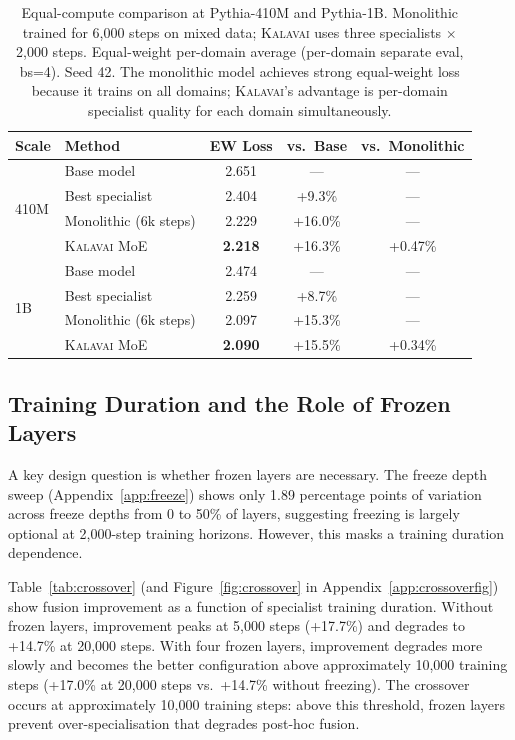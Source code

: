\documentclass{article}
\newcommand{\kalavai}{\textsc{Kalavai}\xspace}
\begin{document}
\begin{table}[h]
\centering
\caption{Equal-compute comparison at Pythia-410M and Pythia-1B. Monolithic trained for 6,000 steps on mixed data; \kalavai uses three specialists $\times$ 2,000 steps. Equal-weight per-domain average (per-domain separate eval, bs=4). Seed 42. The monolithic model achieves strong equal-weight loss because it trains on all domains; \kalavai's advantage is per-domain specialist quality for each domain simultaneously.}
\label{tab:monolithic}
\begin{tabular}{llccc}
\toprule
\textbf{Scale} & \textbf{Method} & \textbf{EW Loss} & \textbf{vs.\ Base} & \textbf{vs.\ Monolithic} \\
\midrule
\multirow{4}{*}{410M}
 & Base model            & 2.651 & ---      & ---       \\
 & Best specialist       & 2.404 & +9.3\%  & ---       \\
 & Monolithic (6k steps) & 2.229 & +16.0\% & ---       \\
 & \kalavai MoE          & \textbf{2.218} & +16.3\% & +0.47\% \\
\midrule
\multirow{4}{*}{1B}
 & Base model            & 2.474 & ---      & ---       \\
 & Best specialist       & 2.259 & +8.7\%  & ---       \\
 & Monolithic (6k steps) & 2.097 & +15.3\% & ---       \\
 & \kalavai MoE          & \textbf{2.090} & +15.5\% & +0.34\% \\
\bottomrule
\end{tabular}
\end{table}

\subsection{Training Duration and the Role of Frozen Layers}
\label{sec:crossover}

A key design question is whether frozen layers are necessary. The freeze depth sweep (Appendix~\ref{app:freeze}) shows only 1.89 percentage points of variation across freeze depths from 0 to 50\% of layers, suggesting freezing is largely optional at 2,000-step training horizons. However, this masks a training duration dependence.

Table~\ref{tab:crossover} (and Figure~\ref{fig:crossover} in Appendix~\ref{app:crossoverfig}) show fusion improvement as a function of specialist training duration. Without frozen layers, improvement peaks at 5,000 steps (+17.7\%) and degrades to +14.7\% at 20,000 steps. With four frozen layers, improvement degrades more slowly and becomes the better configuration above approximately 10,000 training steps (+17.0\% at 20,000 steps vs.\ +14.7\% without freezing). The crossover occurs at approximately 10,000 training steps: above this threshold, frozen layers prevent over-specialisation that degrades post-hoc fusion.
\end{document}
